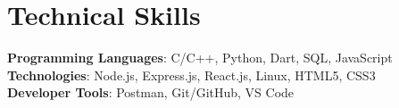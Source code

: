 \documentclass[letterpaper,11pt]{article}
\makeatletter
\newcommand{\resumeItem}[1]{
  \item\small{
    {#1 \vspace{-2pt}}
  }
}
\newcommand{\resumeProjectHeading}[2]{
    \item
    \begin{tabular*}{1.001\textwidth}{l@{\extracolsep{\fill}}r}
      \small#1 & \textbf{\small #2}\\
    \end{tabular*}\vspace{-7pt}
}
\newcommand{\resumeSubHeadingListStart}{\begin{itemize}[leftmargin=0.0in, label={}]}
\newcommand{\resumeItemListStart}{\begin{itemize}}
\newcommand{\resumeItemListEnd}{\end{itemize}\vspace{-5pt}}
\makeatother
\begin{document}
\section{Technical Skills}
 \begin{itemize}[leftmargin=0.15in, label={}]
    \small{\item{
     \textbf{Programming Languages}{:  C/C++, Python, Dart, SQL, JavaScript} \\
     \textbf{Technologies}{: Node.js, Express.js, React.js, Linux, HTML5, CSS3} \\
     \textbf{Developer Tools}{: Postman, Git/GitHub, VS Code}
    }}
 \end{itemize}
 \vspace{-15pt}










    
          

          
          
\end{document}
